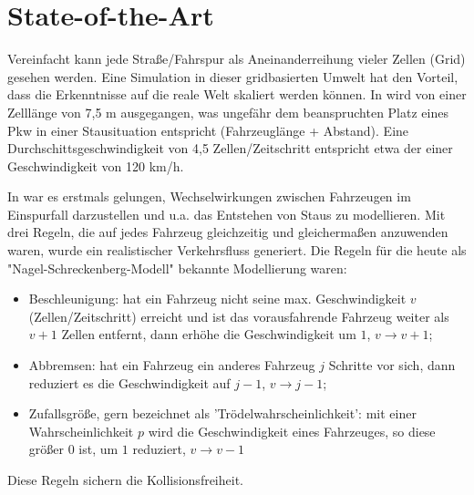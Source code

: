 \section{State-of-the-Art}
\label{sec:sota}

Vereinfacht kann jede Straße/Fahrspur als Aneinanderreihung vieler Zellen (Grid) gesehen werden. Eine Simulation in dieser gridbasierten Umwelt hat den Vorteil, dass die Erkenntnisse auf die reale Welt skaliert werden können. In \cite{na-sch} wird von einer Zelllänge von 7,5 m ausgegangen, was ungefähr dem beanspruchten Platz eines Pkw in einer Stausituation entspricht (Fahrzeuglänge + Abstand). Eine Durchschittsgeschwindigkeit von 4,5 Zellen/Zeitschritt entspricht etwa der einer Geschwindigkeit von 120 km/h.

In \cite{na-sch} war es erstmals gelungen, Wechselwirkungen zwischen Fahrzeugen im Einspurfall darzustellen und u.a. das Entstehen von Staus zu modellieren. Mit drei Regeln, die auf jedes Fahrzeug gleichzeitig und gleichermaßen anzuwenden waren, wurde ein realistischer Verkehrsfluss generiert. Die Regeln für die heute als "Nagel-Schreckenberg-Modell" bekannte Modellierung waren: 

\begin{itemize}
\item Beschleunigung: hat ein Fahrzeug nicht seine max. Geschwindigkeit $v$ (Zellen/Zeitschritt) erreicht und ist das vorausfahrende Fahrzeug weiter als $v+1$ Zellen entfernt, dann erhöhe die Geschwindigkeit um $1$, $v \rightarrow v+1$;
\item Abbremsen: hat ein Fahrzeug ein anderes Fahrzeug $j$ Schritte vor sich, dann reduziert es die Geschwindigkeit auf $j-1$, $v \rightarrow j-1$;
\item Zufallsgröße, gern bezeichnet als 'Trödelwahrscheinlichkeit': mit einer Wahrscheinlichkeit $p$ wird die Geschwindigkeit eines Fahrzeuges, so diese größer $0$ ist, um $1$ reduziert, $v \rightarrow v-1$
\end{itemize}

Diese Regeln sichern die Kollisionsfreiheit.


